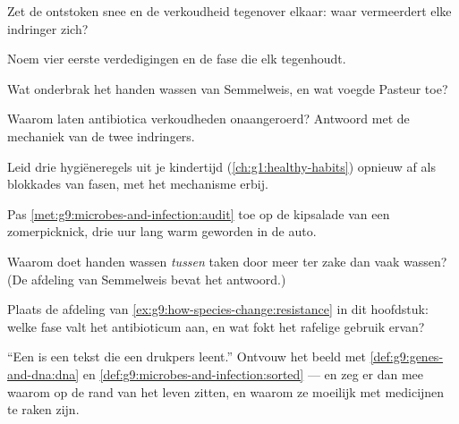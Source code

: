 \begin{exercise}[$\star$]\label{exo:g9:microbes-and-infection:4}
Zet de ontstoken snee en de verkoudheid tegenover elkaar: waar
vermeerdert elke indringer zich?
\end{exercise}

\begin{exercise}[$\star$]\label{exo:g9:microbes-and-infection:5}
Noem vier eerste verdedigingen en de fase die elk tegenhoudt.
\end{exercise}

\begin{exercise}[$\star$]\label{exo:g9:microbes-and-infection:6}
Wat onderbrak het handen wassen van Semmelweis, en wat voegde
Pasteur toe?
\end{exercise}

\begin{exercise}[$\star\star$]\label{exo:g9:microbes-and-infection:7}
Waarom laten antibiotica verkoudheden onaangeroerd? Antwoord met de
mechaniek van de twee indringers.
\end{exercise}

\begin{exercise}[$\star\star$]\label{exo:g9:microbes-and-infection:8}
Leid drie hygiëneregels uit je kindertijd
(\cref{ch:g1:healthy-habits}) opnieuw af als blokkades van fasen,
met het mechanisme erbij.
\end{exercise}

\begin{exercise}[$\star\star$]\label{exo:g9:microbes-and-infection:9}
Pas \cref{met:g9:microbes-and-infection:audit} toe op de
kipsalade van een zomerpicknick, drie uur lang warm geworden in de
auto.
\end{exercise}

\begin{exercise}[$\star\star$]\label{exo:g9:microbes-and-infection:10}
Waarom doet handen wassen \emph{tussen} taken door meer ter zake
dan vaak wassen? (De afdeling van Semmelweis bevat het
antwoord.)
\end{exercise}

\begin{exercise}[$\star\star$]\label{exo:g9:microbes-and-infection:11}
Plaats de afdeling van
\cref{ex:g9:how-species-change:resistance} in dit hoofdstuk: welke
fase valt het antibioticum aan, en wat fokt het rafelige gebruik
ervan?
\end{exercise}

\begin{exercise}[$\star\star\star$]\label{exo:g9:microbes-and-infection:12}
``Een  is een tekst die een drukpers leent.'' Ontvouw het
beeld met \cref{def:g9:genes-and-dna:dna} en
\cref{def:g9:microbes-and-infection:sorted} --- en zeg er dan mee
waarom  op de rand van het leven zitten, en waarom ze
moeilijk met medicijnen te raken zijn.
\end{exercise}


